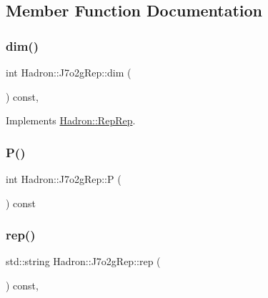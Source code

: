 \subsection{Member Function Documentation}
\mbox{\label{structHadron_1_1J7o2gRep_a97ec31b808524988adead87fa89810ef}} 
\subsubsection{\texorpdfstring{dim()}{dim()}}
{\footnotesize\ttfamily int Hadron\+::\+J7o2g\+Rep\+::dim (\begin{DoxyParamCaption}{ }\end{DoxyParamCaption}) const\hspace{0.3cm}{\ttfamily [inline]}, {\ttfamily [virtual]}}



Implements \mbox{\hyperlink{structHadron_1_1RepRep_a92c8802e5ed7afd7da43ccfd5b7cd92b}{Hadron\+::\+Rep\+Rep}}.

\mbox{\label{structHadron_1_1J7o2gRep_a62e4c7ff9d219d3d00fa5cd6ee9612d1}} 
\subsubsection{\texorpdfstring{P()}{P()}}
{\footnotesize\ttfamily int Hadron\+::\+J7o2g\+Rep\+::P (\begin{DoxyParamCaption}{ }\end{DoxyParamCaption}) const\hspace{0.3cm}{\ttfamily [inline]}}

\mbox{\label{structHadron_1_1J7o2gRep_a77d8605eefc2eb9ae91df0e231d4593b}} 
\subsubsection{\texorpdfstring{rep()}{rep()}}
{\footnotesize\ttfamily std\+::string Hadron\+::\+J7o2g\+Rep\+::rep (\begin{DoxyParamCaption}{ }\end{DoxyParamCaption}) const\hspace{0.3cm}{\ttfamily [inline]}, {\ttfamily [virtual]}}



